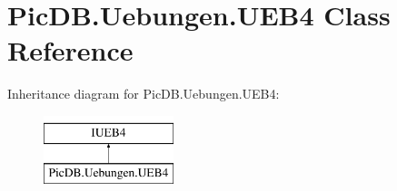 \hypertarget{class_pic_d_b_1_1_uebungen_1_1_u_e_b4}{}\section{Pic\+D\+B.\+Uebungen.\+U\+E\+B4 Class Reference}
\label{class_pic_d_b_1_1_uebungen_1_1_u_e_b4}
Inheritance diagram for Pic\+D\+B.\+Uebungen.\+U\+E\+B4\+:\begin{figure}[H]
\begin{center}
\leavevmode
\includegraphics[height=2.000000cm]{class_pic_d_b_1_1_uebungen_1_1_u_e_b4}
\end{center}
\end{figure}
